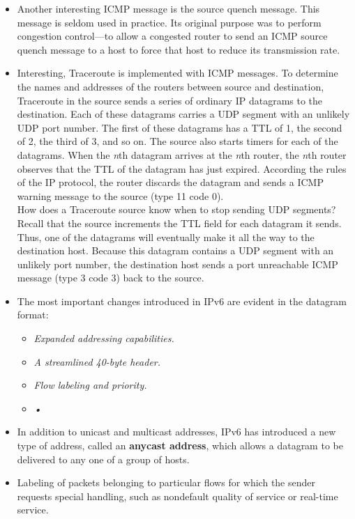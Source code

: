 \begin{itemize}
\item
Another interesting ICMP message is the source quench message. This message is seldom used in practice. Its original purpose was to perform congestion control---to allow a congested router to send an ICMP source quench message to a host to force that host to reduce its transmission rate.

\item
Interesting, Traceroute is implemented with ICMP messages. To determine the names and addresses of the routers between source and destination, Traceroute in the source sends a series of ordinary IP datagrams to the destination. Each of these datagrams carries a UDP segment with an unlikely UDP port number. The first of these datagrams has a TTL of 1, the second of 2, the third of 3, and so on. The source also starts timers for each of the datagrams. When the \textit{n}th datagram arrives at the \textit{n}th router, the \textit{n}th router observes that the TTL of the datagram has just expired. According the rules of the IP protocol, the router discards the datagram and sends a ICMP warning message to the source (type 11 code 0).\\
How does a Traceroute source know when to stop sending UDP segments? Recall that the source increments the TTL field for each datagram it sends. Thus, one of the datagrams will eventually make it all the way to the destination host. Because this datagram contains a UDP segment with an unlikely port number, the destination host sends a port unreachable ICMP message (type 3 code 3) back to the source.

\item
The most important changes introduced in IPv6 are evident in the datagram format:
\begin{itemize}
\item\textit{Expanded addressing capabilities.}
\item\textit{A streamlined 40-byte header.}
\item\textit{Flow labeling and priority.}
\item\textit{•}
\end{itemize}

\item
In addition to unicast and multicast addresses, IPv6 has introduced a new type of address, called an \textbf{anycast address}, which allows a datagram to be delivered to any one of a group of hosts.

\item
Labeling of packets belonging to particular flows for which the sender requests special handling, such as nondefault quality of service or real-time service.


\end{itemize}
